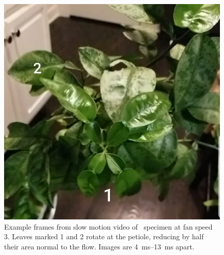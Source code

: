 \begin{figure}
\begin{center}
\includegraphics[width=0.49\columnwidth]{figures/Snapshot4.jpg}
\end{center}
\caption{Example frames from slow motion video of \Cxparadisi\ specimen at fan speed 3. Leaves marked 1 and 2 rotate at the petiole, reducing by half their area normal to the flow. Images are \SIrange{4}{13}{\milli\second} apart.}
\label{fig:results:leafmovement}
\end{figure}


